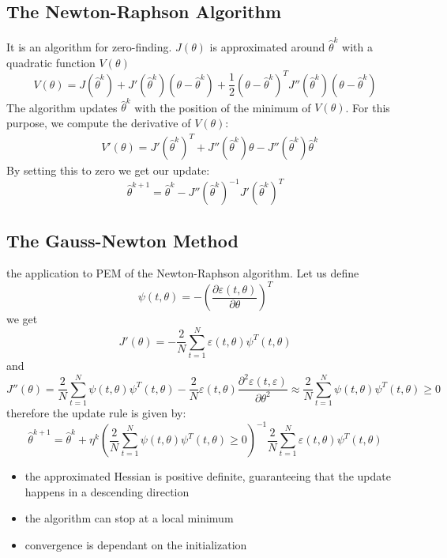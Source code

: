 \documentclass{book}
\theoremstyle{definition}
\theoremstyle{remark}
\theoremstyle{remark}
\begin{document}
\subsection{The Newton-Raphson Algorithm}
It is an algorithm for zero-finding. $J(\theta)$ is approximated around $\hat{\theta}^k$ with a quadratic function $V(\theta)$
\[
    V(\theta)=J(\hat{\theta}^k)+J'(\hat{\theta}^k)(\theta-\hat{\theta}^k)+\displaystyle\frac{1}{2}(\theta-\hat{\theta}^k)^TJ''(\hat{\theta}^k)(\theta-\hat{\theta}^k)
\]
The algorithm updates $\hat{\theta}^k$ with the position of the minimum of $V(\theta)$. For this purpose, we compute the derivative of $V(\theta)$:
\begin{align}
    &V'(\theta)=J'(\hat{\theta}^k)^T+J''(\hat{\theta}^k)\theta-J''(\hat{\theta}^k)\hat{\theta}^k
\end{align}
By setting this to zero we get our update:
\[
    \hat{\theta}^{k+1}=\hat{\theta}^k-J''(\hat{\theta}^k)^{-1}J'(\hat{\theta}^k)^T
\]



\subsection{The Gauss-Newton Method}
the application to PEM of the Newton-Raphson algorithm. Let us define 
\[
    \psi(t,\theta)=-\left(\displaystyle\frac{\partial\varepsilon(t,\theta)}{\partial\theta}\right)^T
\]
we get 
\[
    J'(\theta)=-\displaystyle\frac{2}{N}\displaystyle\sum_{t=1}^{N}\varepsilon(t,\theta)\psi^T(t,\theta)
\]
and
\[
    J''(\theta)=\displaystyle\frac{2}{N}\displaystyle\sum_{t=1}^{N}\psi(t,\theta)\psi^T(t,\theta)-\displaystyle\frac{2}{N}\varepsilon(t,\theta)\displaystyle\frac{\partial^2\varepsilon(t,\varepsilon)}{\partial\theta^2}\approx\displaystyle\frac{2}{N}\displaystyle\sum_{t=1}^{N}\psi(t,\theta)\psi^T(t,\theta)\geq 0 
\]
therefore the update rule is given by:
\[
    \hat{\theta}^{k+1}=\hat{\theta}^k + \eta^k(\displaystyle\frac{2}{N}\displaystyle\sum_{t=1}^{N}\psi(t,\theta)\psi^T(t,\theta)\geq 0 )^{-1}\displaystyle\frac{2}{N}\displaystyle\sum_{t=1}^{N}\varepsilon(t,\theta)\psi^T(t,\theta)
\]
\begin{itemize}
    \item the approximated Hessian is positive definite, guaranteeing that the update happens in a descending direction
    \item the algorithm can stop at a local minimum
    \item convergence is dependant on the initialization
\end{itemize}
\end{document}
